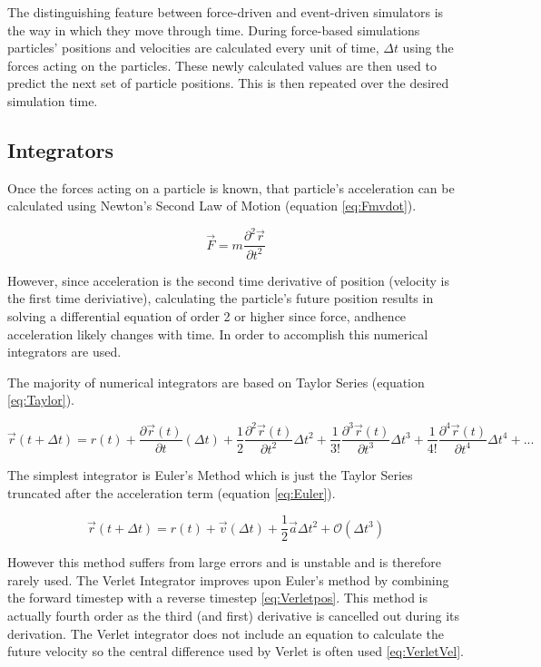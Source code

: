 \documentclass[12pt]{UoAthesis}
\begin{document}
The distinguishing feature between force-driven and event-driven simulators is
the way in which they move through time. During force-based simulations
particles' positions and velocities are calculated every unit of time, $\Delta
t$ using the forces acting on the particles. These newly calculated values are
then used to predict the next set of particle positions. This is then repeated
over the desired simulation time.

\subsection{Integrators} 
Once the forces acting on a particle is known, that
particle's acceleration can be calculated using Newton's Second Law of Motion
(equation \ref{eq:Fmvdot}).

\begin{equation} \vec{F} = m \frac{\partial^2 \vec{r}}{\partial t^2}
\label{eq:Fmvdot} \end{equation}

However, since acceleration is the second time derivative of position (velocity
is the first time deriviative), calculating the particle's future position
results in solving a differential equation of order 2 or higher since force,
andhence acceleration likely changes with time. In order to accomplish this
numerical integrators are used.

The majority of numerical integrators are based on Taylor Series (equation
\ref{eq:Taylor}).

\begin{equation} 
\vec{r}(t+\Delta t) = r(t) + 
\frac{\partial\vec{r}(t)}{\partial t}(\Delta t) + 
\frac{1}{2}\frac{\partial^2\vec{r}(t)}{\partial t^2}\Delta t^2 + 
\frac{1}{3!}\frac{\partial^3\vec{r}(t)}{\partial t^3}\Delta t^3 
+ \frac{1}{4!}\frac{\partial^4\vec{r}(t)}{\partial t^4}\Delta t^4 
+ ... \label{eq:Taylor} 
\end{equation}

The simplest integrator is Euler's Method which is just the Taylor Series
truncated after the acceleration term (equation \ref{eq:Euler}).

\begin{equation} \vec{r}(t+\Delta t) = r(t) + \vec{v}(\Delta t) +
\frac{1}{2}\vec{a}\Delta t^2 + \mathcal{O}(\Delta t^3) \label{eq:Euler}
\end{equation}

However this method suffers from large errors and is unstable \cite{Haile1997}
and is therefore rarely used. The Verlet Integrator \cite{Verlet1967} improves
upon Euler's method by combining the forward timestep with a reverse timestep
\eqref{eq:Verletpos}. This method is actually fourth order as the third (and
first) derivative is cancelled out during its derivation. The Verlet integrator
does not include an equation to calculate the future velocity so the central
difference used by Verlet is often used \eqref{eq:VerletVel}.
\end{document}
